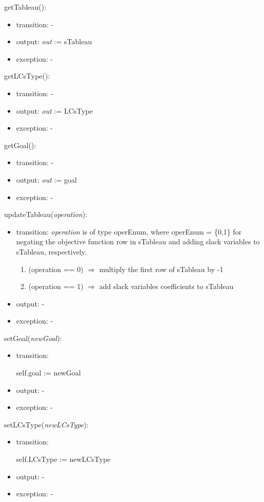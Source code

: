 \documentclass[12pt, titlepage]{article}
\begin{document}
\noindent 
getTableau():
\begin{itemize}
	\item transition: -
	\item output: \textit{out} := sTableau
	\item exception: -
\end{itemize}

\noindent 
getLCsType():
\begin{itemize}
	\item transition: -
	\item output: \textit{out} := LCsType
	\item exception: -
\end{itemize}

\noindent 
getGoal():
\begin{itemize}
	\item transition: -
	\item output: \textit{out} := goal
	\item exception: -
\end{itemize}

\noindent 
updateTableau(\textit{operation}):
\begin{itemize}
	\item transition: \textit{operation} is of type operEnum, where operEnum = 
	\{0,1\} for negating the objective function row in sTableau and adding 
	slack variables to sTableau, respectively.
	\begin{enumerate}
		\item (operation == 0)  \hspace{3cm} $\Rightarrow$ multiply the first 
		row of sTableau by -1
		\item (operation == 1) \hspace{3cm} $\Rightarrow$ add slack variables 
		coefficients to sTableau
	\end{enumerate}
	\item output: -
	\item exception: -
\end{itemize}

\noindent 
setGoal(\textit{newGoal}):
\begin{itemize}
	\item transition: 
	
	self.goal := newGoal
	\item output: -
	\item exception: -
\end{itemize}

\noindent 
setLCsType(\textit{newLCsType}):
\begin{itemize}
	\item transition: 
	
	self.LCsType := newLCsType
	\item output: -
	\item exception: -
\end{itemize}
\end{document}
